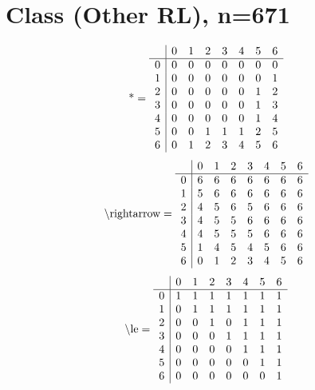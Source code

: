 \documentclass[11pt]{article}
\begin{document}
\section{Class (Other RL), n=671}
\[\text{*} = 
\begin{array}{r | r r r r r r r}
 & 0 & 1 & 2 & 3 & 4 & 5 & 6 \\ \hline
0 & 0 & 0 & 0 & 0 & 0 & 0 & 0 \\
1 & 0 & 0 & 0 & 0 & 0 & 0 & 1 \\
2 & 0 & 0 & 0 & 0 & 0 & 1 & 2 \\
3 & 0 & 0 & 0 & 0 & 0 & 1 & 3 \\
4 & 0 & 0 & 0 & 0 & 0 & 1 & 4 \\
5 & 0 & 0 & 1 & 1 & 1 & 2 & 5 \\
6 & 0 & 1 & 2 & 3 & 4 & 5 & 6 \\
\end{array}
\]
\[\text{\textbackslash rightarrow} = 
\begin{array}{r | r r r r r r r}
 & 0 & 1 & 2 & 3 & 4 & 5 & 6 \\ \hline
0 & 6 & 6 & 6 & 6 & 6 & 6 & 6 \\
1 & 5 & 6 & 6 & 6 & 6 & 6 & 6 \\
2 & 4 & 5 & 6 & 5 & 6 & 6 & 6 \\
3 & 4 & 5 & 5 & 6 & 6 & 6 & 6 \\
4 & 4 & 5 & 5 & 5 & 6 & 6 & 6 \\
5 & 1 & 4 & 5 & 4 & 5 & 6 & 6 \\
6 & 0 & 1 & 2 & 3 & 4 & 5 & 6 \\
\end{array}
\]
\[\text{\textbackslash le} = 
\begin{array}{r | r r r r r r r}
 & 0 & 1 & 2 & 3 & 4 & 5 & 6 \\ \hline
0 & 1 & 1 & 1 & 1 & 1 & 1 & 1 \\
1 & 0 & 1 & 1 & 1 & 1 & 1 & 1 \\
2 & 0 & 0 & 1 & 0 & 1 & 1 & 1 \\
3 & 0 & 0 & 0 & 1 & 1 & 1 & 1 \\
4 & 0 & 0 & 0 & 0 & 1 & 1 & 1 \\
5 & 0 & 0 & 0 & 0 & 0 & 1 & 1 \\
6 & 0 & 0 & 0 & 0 & 0 & 0 & 1 \\
\end{array}
\]
\end{document}

